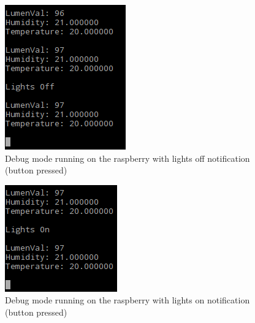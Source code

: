 \documentclass[10pt]{article}
\begin{document}
\begin{figure}[H]
  \centering
  \includegraphics[max width=\textwidth]{../imgs/debugLightsOff.png}
  \caption{\label{debugOff}Debug mode running on the raspberry with lights off notification (button pressed)}
\end{figure}


\begin{figure}[H]
  \centering
  \includegraphics[max width=\textwidth]{../imgs/debugLightsOn.png}
  \caption{\label{debugOn}Debug mode running on the raspberry with lights on notification (button pressed)}
\end{figure}
\end{document}
